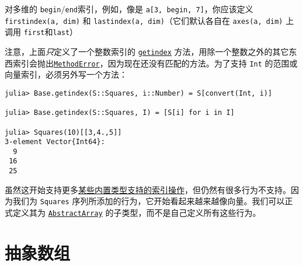 对多维的 \texttt{begin}/\texttt{end}索引，例如，像是 \texttt{a[3, begin, 7]}，你应该定义 \texttt{firstindex(a, dim)} 和 \texttt{lastindex(a, dim)}（它们默认各自在 \texttt{axes(a, dim)} 上调用 \texttt{first}和\texttt{last}）



注意，上面\emph{只}定义了一个整数索引的 \hyperlink{13720608614876840481}{\texttt{getindex}} 方法，用除一个整数之外的其它东西索引会抛出\hyperlink{68769522931907606}{\texttt{MethodError}}，因为现在还没有匹配的方法。为了支持 \texttt{Int} 的范围或向量索引，必须另外写一个方法：




\begin{verbatim}
julia> Base.getindex(S::Squares, i::Number) = S[convert(Int, i)]

julia> Base.getindex(S::Squares, I) = [S[i] for i in I]

julia> Squares(10)[[3,4.,5]]
3-element Vector{Int64}:
  9
 16
 25
\end{verbatim}



虽然这开始支持更多\hyperlink{16717190941363337071}{某些内置类型支持的索引操作}，但仍然有很多行为不支持。因为我们为 \texttt{Squares} 序列所添加的行为，它开始看起来越来越像向量。我们可以正式定义其为 \hyperlink{6514416309183787338}{\texttt{AbstractArray}} 的子类型，而不是自己定义所有这些行为。



\hypertarget{522338241536202486}{}


\section{抽象数组}





